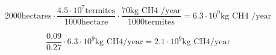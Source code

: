 \documentclass[11pt]{article}
\newcommand*{\vs}{\vspace{1cm}}
\begin{document}
\[2000\text{hectares}\cdot \frac{4.5\cdot 10^7\text{termites}}{1000\text{hectare}}\cdot\frac{70\text{kg CH4 /year}}{1000\text{termites}}=6.3\cdot 10^9 \text{kg CH4 /year}\]

\vs
\[\frac{0.09}{0.27}\cdot 6.3\cdot 10^9\text{kg CH4/year}=2.1\cdot 10^9\text{kg CH4/year}\] 
\end{document}
